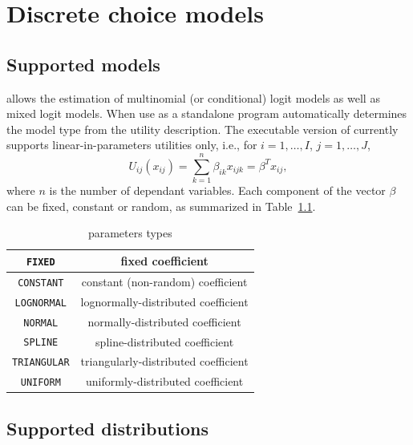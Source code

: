 \chapter{Discrete choice models}

\section{Supported models}
\label{sec:models}

\amlet{} allows the estimation of multinomial (or conditional) logit
models as well as mixed logit models.
When use as a standalone program \amlet{} automatically determines the model type from the utility description.
The executable version of \amlet{} currently supports linear-in-parameters utilities only, i.e., for $i = 1,\ldots,I$, $j = 1,\ldots,J$,
\[
U_{ij}(x_{ij}) = \sum_{k = 1}^{n} \beta_{ik}x_{ijk} = \beta^T x_{ij},
\]
where $n$ is the number of dependant variables. Each component of the
vector $\beta$ can be fixed, constant or random, as summarized in
Table~\ref{tab:parameters}.

\begin{table}[htb]
\begin{center}
\begin{tabular}{|c|c|}
\hline
\verb|FIXED| & fixed coefficient \\
\hline
\verb|CONSTANT| & constant (non-random) coefficient \\
\hline
\verb|LOGNORMAL| & lognormally-distributed coefficient \\
\hline
\verb|NORMAL| & normally-distributed coefficient \\
\hline
\verb|SPLINE| & spline-distributed coefficient \\
\hline
\verb|TRIANGULAR| & triangularly-distributed coefficient \\
\hline
\verb|UNIFORM| & uniformly-distributed coefficient \\
\hline
\end{tabular}
\caption{parameters types}
\label{tab:parameters}
\end{center}
\end{table}

\section{Supported distributions}

